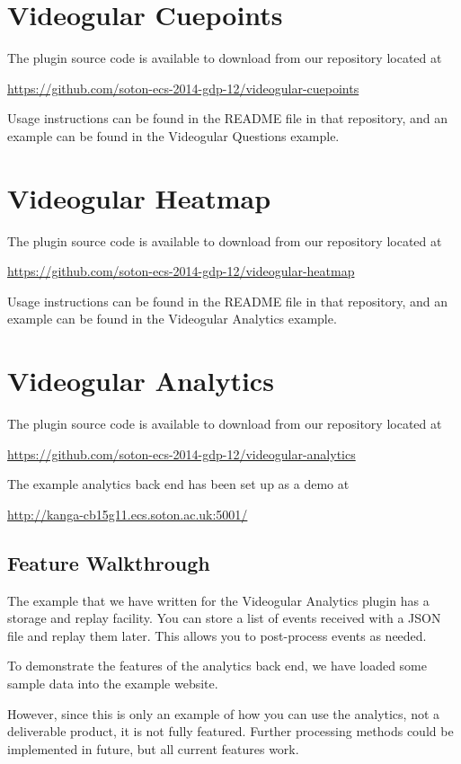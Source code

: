 \documentclass[12pt,a4paper]{article}
\begin{document}
\section{Videogular Cuepoints}

The plugin source code is available to download from our repository located at

\url{https://github.com/soton-ecs-2014-gdp-12/videogular-cuepoints}

Usage instructions can be found in the README file in that repository, and an example can be found in the Videogular Questions example.

\section{Videogular Heatmap}

The plugin source code is available to download from our repository located at

\url{https://github.com/soton-ecs-2014-gdp-12/videogular-heatmap}

Usage instructions can be found in the README file in that repository, and an example can be found in the Videogular Analytics example.

\section{Videogular Analytics}

The plugin source code is available to download from our repository located at

\url{https://github.com/soton-ecs-2014-gdp-12/videogular-analytics}

The example analytics back end has been set up as a demo at

\url{http://kanga-cb15g11.ecs.soton.ac.uk:5001/}

\subsection{Feature Walkthrough}

The example that we have written for the Videogular Analytics plugin has a storage and replay facility. You can store a list of events received with a JSON file and replay them later. This allows you to post-process events as needed.

To demonstrate the features of the analytics back end, we have loaded some sample data into the example website.

However, since this is only an example of how you can use the analytics, not a deliverable product, it is not fully featured. Further processing methods could be implemented in future, but all current features work.
\end{document}
